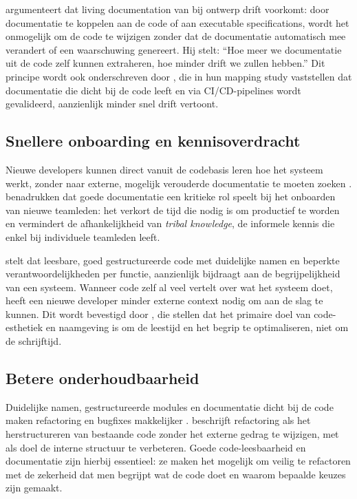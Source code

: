 \textcite{martraire2019livingdocumentation} argumenteert dat living documentation van bij ontwerp drift voorkomt: door documentatie te koppelen aan de code of aan executable specifications, wordt het onmogelijk om de code te wijzigen zonder dat de documentatie automatisch mee verandert of een waarschuwing genereert. Hij stelt: ``Hoe meer we documentatie uit de code zelf kunnen extraheren, hoe minder drift we zullen hebben.'' Dit principe wordt ook onderschreven door \textcite{theunissen2022mappingdocumentation}, die in hun mapping study vaststellen dat documentatie die dicht bij de code leeft en via CI/CD-pipelines wordt gevalideerd, aanzienlijk minder snel drift vertoont.

\subsection{Snellere onboarding en kennisoverdracht}
Nieuwe developers kunnen direct vanuit de codebasis leren hoe het systeem werkt, zonder naar externe, mogelijk verouderde documentatie te moeten zoeken \autocite{bhatti2021docsdevelopers}. \textcite{bhatti2021docsdevelopers} benadrukken dat goede documentatie een kritieke rol speelt bij het onboarden van nieuwe teamleden: het verkort de tijd die nodig is om productief te worden en vermindert de afhankelijkheid van \textit{tribal knowledge}, de informele kennis die enkel bij individuele teamleden leeft.

\textcite{martin2008clean} stelt dat leesbare, goed gestructureerde code met duidelijke namen en beperkte verantwoordelijkheden per functie, aanzienlijk bijdraagt aan de begrijpelijkheid van een systeem. Wanneer code zelf al veel vertelt over wat het systeem doet, heeft een nieuwe developer minder externe context nodig om aan de slag te kunnen. Dit wordt bevestigd door \textcite{boswell2011readablecode}, die stellen dat het primaire doel van code-esthetiek en naamgeving is om de leestijd en het begrip te optimaliseren, niet om de schrijftijd.

\subsection{Betere onderhoudbaarheid}
Duidelijke namen, gestructureerde modules en documentatie dicht bij de code maken refactoring en bugfixes makkelijker \autocite{fowler2018refactoring}. \textcite{fowler2018refactoring} beschrijft refactoring als het herstructureren van bestaande code zonder het externe gedrag te wijzigen, met als doel de interne structuur te verbeteren. Goede code-leesbaarheid en documentatie zijn hierbij essentieel: ze maken het mogelijk om veilig te refactoren met de zekerheid dat men begrijpt wat de code doet en waarom bepaalde keuzes zijn gemaakt.

